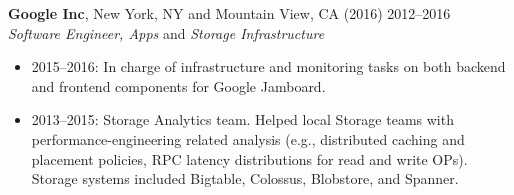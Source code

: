 \documentclass[centered,overlapped]{res}
\begin{document}
\begin{resume}
  \textbf{Google Inc}, New York, NY and Mountain View, CA (2016) \hfill 2012--2016 \\
  {\sl Software Engineer, Apps} and {\sl Storage Infrastructure}
  \begin{itemize}  \itemsep -2pt
  \item  2015--2016: In charge of infrastructure and monitoring tasks on both backend and frontend components for Google Jamboard.
  \item  2013--2015: Storage Analytics team. Helped local Storage teams with performance-engineering related analysis (e.g., distributed caching and placement policies, RPC latency distributions for read and write OPs). Storage systems included Bigtable, Colossus, Blobstore, and Spanner.
  \end{itemize}



\end{resume}
\end{document}
